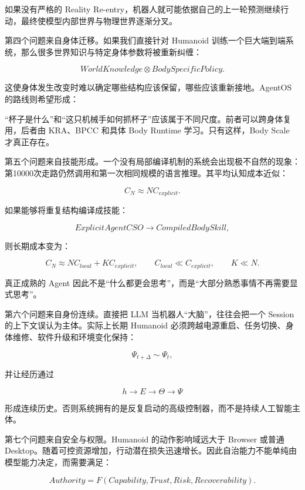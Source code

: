 如果没有严格的 Reality Re-entry，机器人就可能依据自己的上一轮预测继续行动，最终使模型内部世界与物理世界逐渐分叉。

第四个问题来自身体迁移。如果我们直接针对 Humanoid 训练一个巨大端到端系统，那么很多世界知识与特定身体参数将被重新纠缠：

$$
WorldKnowledge
\otimes
BodySpecificPolicy.
$$

这使身体发生改变时难以确定哪些结构应该保留，哪些应该重新接地。AgentOS 的路线则希望形成：

\begin{statementbox}
\centering
{}
\end{statementbox}

“杯子是什么”和“这只机械手如何抓杯子”应该属于不同尺度。前者可以跨身体复用，后者由 KRA、BPCC 和具体 Body Runtime 学习。只有这样，Body Scale 才真正存在。

第五个问题来自技能形成。一个没有局部编译机制的系统会出现极不自然的现象：第10000次走路仍然调用和第一次相同规模的语言推理。其平均认知成本近似：

$$
C_N
\approx
N C_{explicit}.
$$

如果能够将重复结构编译成技能：

$$
ExplicitAgentCSO
\rightarrow
CompiledBodySkill,
$$

则长期成本变为：

$$
C_N
\approx
N C_{local}
+
K C_{explicit},
\qquad
C_{local}\ll C_{explicit},
\qquad
K\ll N.
$$

真正成熟的 Agent 因此不是“什么都更会思考”，而是“大部分熟悉事情不再需要显式思考”。

第六个问题来自身份连续。直接把 LLM 当机器人“大脑”，往往会把一个 Session 的上下文误认为主体。实际上长期 Humanoid 必须跨越电源重启、任务切换、身体维修、软件升级和环境变化保持：

$$
\Psi_{t+\Delta}\sim\Psi_t,
$$

并让经历通过

$$
h\rightarrow E\rightarrow\Theta\rightarrow\Psi
$$

形成连续历史。否则系统拥有的是反复启动的高级控制器，而不是持续人工智能主体。

第七个问题来自安全与权限。Humanoid 的动作影响域远大于 Browser 或普通 Desktop。随着可控资源增加，行动潜在损失迅速增长。因此自治能力不能单纯由模型能力决定，而需要满足：

$$
Authority
=
F(Capability,Trust,Risk,Recoverability).
$$

